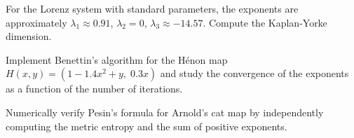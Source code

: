 \begin{exercise}
For the Lorenz system with standard parameters, the exponents are
approximately $\lambda_1 \approx 0.91$, $\lambda_2 = 0$,
$\lambda_3 \approx -14.57$. Compute the Kaplan-Yorke dimension.
\end{exercise}

\begin{exercise}
Implement Benettin's algorithm for the H\'enon map
$H(x,y) = (1 - 1.4x^2 + y,\; 0.3x)$ and study the convergence of the
exponents as a function of the number of iterations.
\end{exercise}

\begin{exercise}
Numerically verify Pesin's formula for Arnold's cat map by independently
computing the metric entropy and the sum of positive exponents.
\end{exercise}
